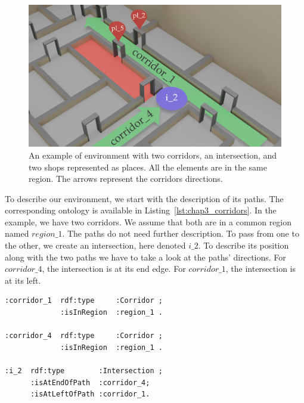 \begin{figure}[ht!]
\centering
\includegraphics[scale=0.16]{figures/chapter3/SSR_example.png}
\caption{\label{fig:chap3_example} An example of environment with two corridors, an intersection, and two shops represented as places. All the elements are in the same region. The arrows represent the corridors directions.}
\end{figure}

To describe our environment, we start with the description of its paths. The corresponding ontology is available in Listing~\ref{lst:chap3_corridors}. In the example, we have two corridors. We assume that both are in a common region named $region\_1$. The paths do not need further description. To pass from one to the other, we create an intersection, here denoted $i\_2$. To describe its position along with the two paths we have to take a look at the paths' directions. For $corridor\_4$, the intersection is at its end edge. For $corridor\_1$, the intersection is at its left.

\begin{lstlisting}[frame=single, basicstyle=\scriptsize\ttfamily, label={lst:chap3_corridors}, caption={Description of the two corridors and their common intersection in the OWL language using the Turle syntax.},captionpos=b, style=OwlTurtle_indiv]
:corridor_1  rdf:type     :Corridor ;
             :isInRegion  :region_1 .
             
:corridor_4  rdf:type     :Corridor ;
             :isInRegion  :region_1 .
             
:i_2  rdf:type        :Intersection ;
      :isAtEndOfPath  :corridor_4;
      :isAtLeftOfPath :corridor_1.
\end{lstlisting}

